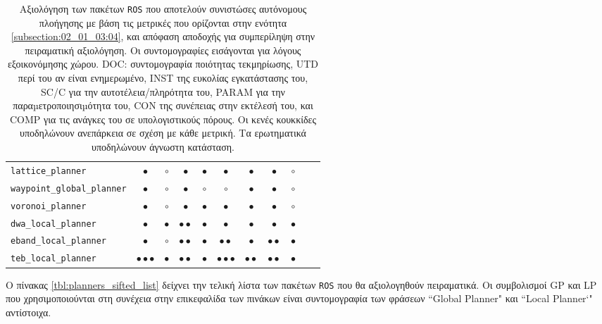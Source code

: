 \begin{table}[h]
\begin{tabular}{lccccccccc|c}
  \texttt{lattice\_planner}          & $\bullet$                 & $\circ$     & $\bullet$         & $\bullet$ & $\bullet$               & $\bullet$        & $\bullet$               & $\circ$      \\
  \texttt{waypoint\_global\_planner} & $\bullet$                 & $\circ$     & $\bullet$         & $\circ$   & $\circ$                 & $\bullet$        & $\bullet$               & $\circ$      \\
  \texttt{voronoi\_planner}          & $\bullet$                 & $\circ$     & $\bullet$         & $\bullet$ & $\bullet$               & $\bullet$        & $\bullet$               & $\circ$      \\ \midrule
  \texttt{dwa\_local\_planner}       & $\bullet$                 & $\bullet$   & $\bullet\bullet$  & $\bullet$ & $\bullet$               & $\bullet$        & $\bullet$               & $\bullet$    \\
  \texttt{eband\_local\_planner}     & $\bullet$                 & $\circ$     & $\bullet\bullet$  & $\bullet$ & $\bullet\bullet$        & $\bullet$        & $\bullet\bullet$        & $\bullet$    \\
  \texttt{teb\_local\_planner}       & $\bullet\bullet\bullet$   & $\bullet$   & $\bullet\bullet$  & $\bullet$ & $\bullet\bullet\bullet$ & $\bullet\bullet$ & $\bullet\bullet$        & $\bullet$    \\ \bottomrule
\end{tabular}
\caption{\small Αξιολόγηση των πακέτων \texttt{ROS} που αποτελούν συνιστώσες
         αυτόνομους πλοήγησης με βάση τις μετρικές που ορίζονται στην ενότητα
         \ref{subsection:02_01_03:04}, και απόφαση αποδοχής για συμπερίληψη
         στην πειραματική αξιολόγηση. Οι συντομογραφίες εισάγονται για λόγους
         εξοικονόμησης χώρου. DOC: συντομογραφία ποιότητας τεκμηρίωσης, UTD
         περί του αν είναι ενημερωμένο, INST της ευκολίας εγκατάστασης του,
         SC/C για την αυτοτέλεια/πληρότητα του, PARAM για την
         παραµετροποιησιµότητα του, CON της συνέπειας στην εκτέλεσή του, και
         COMP για τις ανάγκες του σε υπολογιστικούς πόρους. Οι κενές κουκκίδες
         υποδηλώνουν ανεπάρκεια σε σχέση με κάθε μετρική. Τα ερωτηματικά
         υποδηλώνουν άγνωστη κατάσταση.}
\label{tbl:qualitative_metrics}
\end{table}

Ο πίνακας \ref{tbl:planners_sifted_list} δείχνει την τελική λίστα των πακέτων
\texttt{ROS} που θα αξιολογηθούν πειραματικά. Οι συμβολισμοί GP και LP που
χρησιμοποιούνται στη συνέχεια στην επικεφαλίδα των πινάκων είναι συντομογραφία
των φράσεων ``Global Planner" και ``Local Planner`" αντίστοιχα.

